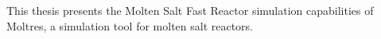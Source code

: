 This thesis presents the Molten Salt Fast Reactor simulation capabilities of
Moltres, a simulation tool for molten salt reactors.